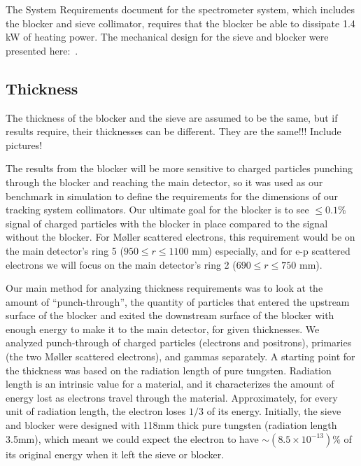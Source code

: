 
The System Requirements document for the spectrometer system, which includes the blocker and sieve collimator, requires that the blocker be able to dissipate 1.4 kW of heating power. The mechanical design for the sieve and blocker were presented here:~\cite{bessuille}.

\subsection{Thickness}

The thickness of the blocker and the sieve are assumed to be the same, but if results require, their thicknesses can be different. They are the same!!! Include pictures!

The results from the blocker will be more sensitive to charged particles punching through the blocker and reaching the main detector, so it was used as our benchmark in simulation to define the requirements for the dimensions of our tracking system collimators. Our ultimate goal for the blocker is to see $\leq0.1\%$ signal of charged particles with the blocker in place compared to the signal without the blocker. For M\o ller scattered electrons, this requirement would be on the main detector's ring 5 ($950\leq r\leq1100$ mm) especially, and for e-p scattered electrons we will focus on the main detector's ring 2 ($690\leq r\leq750$ mm). %

Our main method for analyzing thickness requirements was to look at the amount of ``punch-through'', the quantity of particles that entered the upstream surface of the blocker and exited the downstream surface of the blocker with enough energy to make it to the main detector, for given thicknesses. We analyzed punch-through of charged particles (electrons and positrons), primaries (the two M\o ller scattered electrons), and gammas separately. A starting point for the thickness was based on the radiation length of pure tungsten. Radiation length is an intrinsic value for a material, and it characterizes the amount of energy lost as electrons travel through the material. Approximately, for every unit of radiation length, the electron loses $1/3$ of its energy. Initially, the sieve and blocker were designed with 118mm thick pure tungsten (radiation length 3.5mm), which meant we could expect the electron to have $\sim(8.5\times10^{-13})\%$ of its original energy when it left the sieve or blocker. %

